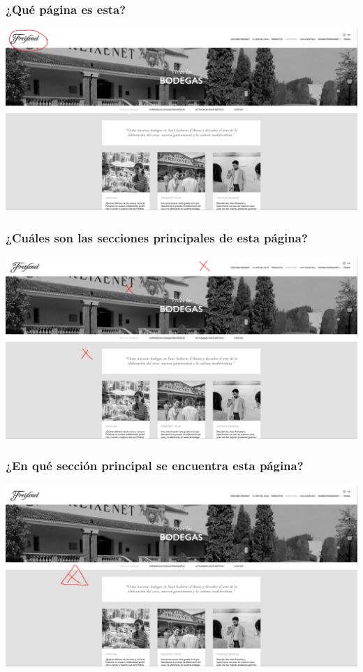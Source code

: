 \documentclass[spanish]{article}
\begin{document}
\subsubsection{¿Qué página es esta?}

\begin{center}
        \includegraphics[scale=.1]{../img/2.png}
\end{center}

\subsubsection{¿Cuáles son las secciones principales de esta página?}

\begin{center}
        \includegraphics[scale=.1]{../img/3.png}
\end{center}

\subsubsection{¿En qué sección principal se encuentra esta página?}

\begin{center}
        \includegraphics[scale=.1]{../img/4.png}
\end{center}
\end{document}
